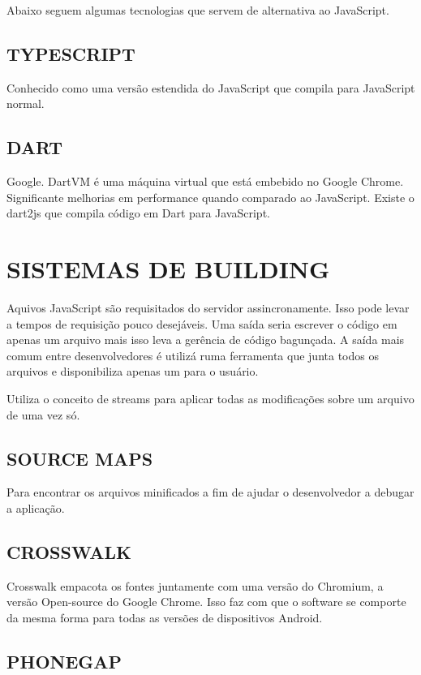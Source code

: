 \documentclass[
12pt,
a4paper,
portuges,
draft
]{report}
\begin{document}
Abaixo seguem algumas tecnologias que servem de alternativa ao
JavaScript.

\section{TYPESCRIPT}

Conhecido como uma versão estendida do JavaScript que compila para
JavaScript normal.

\section{DART}

Google. DartVM é uma máquina virtual que está embebido no Google
Chrome. Significante melhorias em performance quando comparado
ao JavaScript. Existe o dart2js que compila código em Dart para
JavaScript.

\chapter{SISTEMAS DE BUILDING}

Aquivos JavaScript são requisitados do servidor assincronamente. Isso
pode levar a tempos de requisição pouco desejáveis. Uma saída seria
escrever o código em apenas um arquivo mais isso leva a gerência de
código bagunçada. A saída mais comum entre desenvolvedores é utilizá
ruma ferramenta que junta todos os arquivos e disponibiliza apenas um
para o usuário.

Utiliza o conceito de streams para aplicar todas as modificações sobre
um arquivo de uma vez só.

\section{SOURCE MAPS}

Para encontrar os arquivos minificados a fim de ajudar o desenvolvedor a
debugar a aplicação.


\section{CROSSWALK}
Crosswalk empacota os fontes juntamente com uma versão do Chromium, a
versão Open-source do Google Chrome. Isso faz com que o software se
comporte da mesma forma para todas as versões de dispositivos Android.

\section{PHONEGAP}
\end{document}
